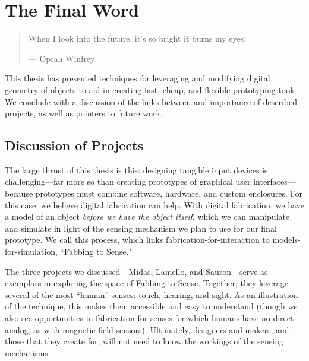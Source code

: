 \chapter{The Final Word}

\begin{quote}
When I look into the future, it's so bright it burns my eyes.

--- Oprah Winfrey
\end{quote}

This thesis has presented techniques for leveraging and modifying digital geometry of objects to aid in creating fast, cheap, and flexible prototyping tools. We conclude with a discussion of the links between and importance of described projects, as well as pointers to future work.



%

\section{Discussion of Projects}

The large thrust of this thesis is this: designing tangible input devices is challenging---far more so than creating prototypes of graphical user interfaces---because prototypes must combine software, hardware, and custom enclosures. For this case, we believe digital fabrication can help. With digital fabrication, we have a model of an object \emph{before we have the object itself}, which we can manipulate and simulate in light of the sensing mechanism we plan to use for our final prototype. We call this process, which links fabrication-for-interaction to models-for-simulation, ``Fabbing to Sense."

The three projects we discussed---Midas, Lamello, and Sauron---serve as exemplars in exploring the space of Fabbing to Sense. Together, they leverage several of the most ``human'' senses: touch, hearing, and sight. As an illustration of the technique, this makes them accessible and easy to understand (though we also see opportunities in fabrication for senses for which humans have no direct analog, as with magnetic field sensors). Ultimately, designers and makers, and those that they create for, will not need to know the workings of the sensing mechanisms.

